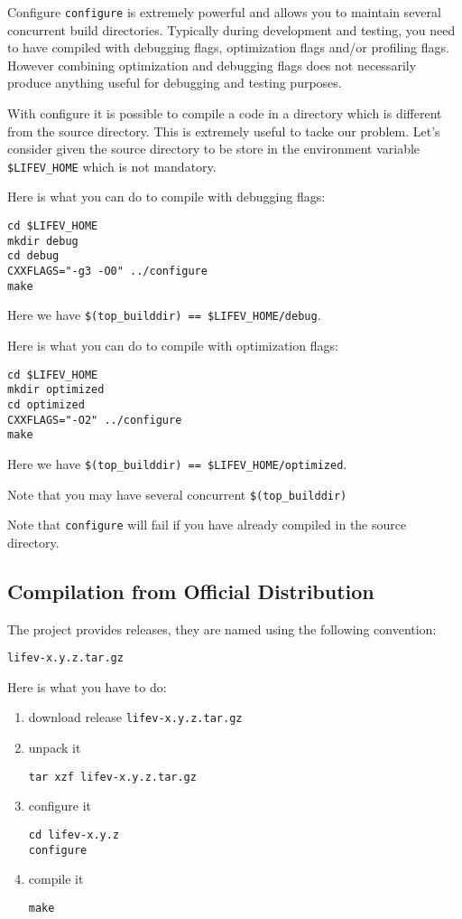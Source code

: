 \begin{hint}{Configure}
  \label{hint:configure}
  \verb!configure! is extremely powerful and allows you to maintain
  several concurrent build directories. Typically during development
  and testing, you need to have \lifev compiled with debugging flags,
  optimization flags and/or profiling flags. However combining
  optimization and debugging flags does not necessarily produce
  anything useful for debugging and testing purposes.

  With configure it is possible to compile a code in a directory which
  is different from the source directory. This is extremely useful to
  tacke our problem. Let's consider given the source directory to be
  store in the environment variable \verb!$LIFEV_HOME! which is not
  mandatory.

Here is what you can do to compile with debugging flags:
\begin{verbatim}
cd $LIFEV_HOME
mkdir debug
cd debug
CXXFLAGS="-g3 -O0" ../configure
make
\end{verbatim}
Here we have \verb+$(top_builddir) == $LIFEV_HOME/debug+.

Here is what you can do to compile with optimization flags:
\begin{verbatim}
cd $LIFEV_HOME
mkdir optimized
cd optimized
CXXFLAGS="-O2" ../configure
make
\end{verbatim}
Here we have \verb+$(top_builddir) == $LIFEV_HOME/optimized+.

\noindent Note that you may have several concurrent \verb+$(top_builddir)+

\noindent Note that \verb!configure! will fail if you have already compiled
\lifev in the source directory.


\end{hint}


\subsection{Compilation from Official Distribution}
\label{sec:comp-from-offic}
The \lifev project provides releases, they are named using the following convention:
\begin{center}
\verb!lifev-x.y.z.tar.gz!
\end{center}

Here is what you have to do:

\begin{enumerate}
\item download \lifev release \verb!lifev-x.y.z.tar.gz!
\item unpack it
\begin{verbatim}
tar xzf lifev-x.y.z.tar.gz
\end{verbatim}
\item configure it
\begin{verbatim}
cd lifev-x.y.z
configure
\end{verbatim}
\item compile it
\begin{verbatim}
make
\end{verbatim}
\end{enumerate}

